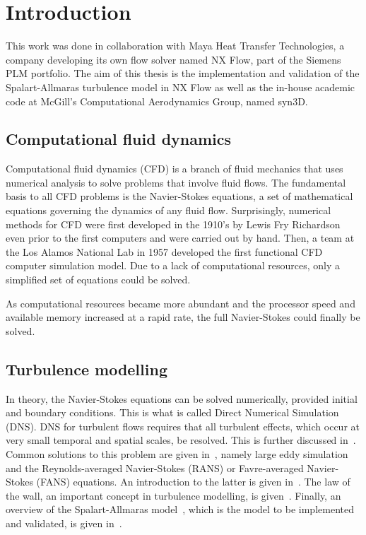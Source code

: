 \chapter{Introduction}
This work was done in collaboration with Maya Heat Transfer Technologies, a company developing its own flow solver named NX Flow, part of the Siemens PLM portfolio. The aim of this thesis is the implementation and validation of the Spalart-Allmaras turbulence model in NX Flow as well as the in-house academic code at McGill's Computational Aerodynamics Group, named syn3D.


\section{Computational fluid dynamics}
Computational fluid dynamics (CFD) is a branch of fluid mechanics that uses numerical analysis to solve problems that involve fluid flows. The fundamental basis to all CFD problems is the Navier-Stokes equations, a set of mathematical equations governing the dynamics of any fluid flow. Surprisingly, numerical methods for CFD were first developed in the 1910's by Lewis Fry Richardson even prior to the first computers and were carried out by hand. Then, a team at the Los Alamos National Lab in 1957 developed the first functional CFD computer simulation model. Due to a lack of computational resources, only a simplified set of equations could be solved.

As computational resources became more abundant and the processor speed and available memory increased at a rapid rate, the full Navier-Stokes could finally be solved.
%
\section{Turbulence modelling}
%
In theory, the Navier-Stokes equations can be solved numerically, provided initial and boundary conditions. This is what is called Direct Numerical Simulation (DNS).  DNS for turbulent flows requires that all turbulent effects, which occur at very small temporal and spatial scales, be resolved. This is further discussed in~. Common solutions to this problem are given in~, namely large eddy simulation and the Reynolds-averaged Navier-Stokes (RANS) or Favre-averaged Navier-Stokes (FANS) equations. An introduction to the latter is given in~. The law of the wall, an important concept in turbulence modelling, is given~. Finally, an overview of the Spalart-Allmaras model~\cite{spalart1994one}, which is the model to be implemented and validated, is given in~.
%
